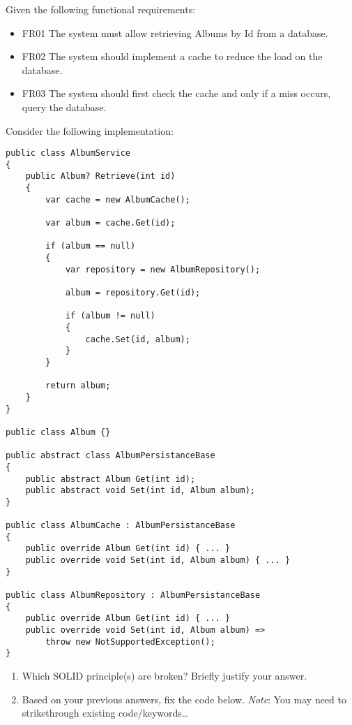 
\pgfmathsetmacro{}

\noindent Given the following functional requirements:

\begin{itemize}
    \item FR01 The system must allow retrieving Albums by Id from a database.
    \item FR02 The system should implement a cache to reduce the load on the database.
    \item FR03 The system should first check the cache and only if a miss occurs, query the database.
\end{itemize}


\vskip 15pt
\noindent Consider the following implementation:

\begin{lstlisting}
public class AlbumService
{
    public Album? Retrieve(int id)
    {
        var cache = new AlbumCache();

        var album = cache.Get(id);

        if (album == null)
        {
            var repository = new AlbumRepository();

            album = repository.Get(id);

            if (album != null)
            {
                cache.Set(id, album);
            }
        }

        return album;
    }
}

public class Album {}

public abstract class AlbumPersistanceBase
{
    public abstract Album Get(int id);
    public abstract void Set(int id, Album album);
}

public class AlbumCache : AlbumPersistanceBase
{
    public override Album Get(int id) { ... }
    public override void Set(int id, Album album) { ... }
}

public class AlbumRepository : AlbumPersistanceBase
{
    public override Album Get(int id) { ... }
    public override void Set(int id, Album album) =>
        throw new NotSupportedException();
}
\end{lstlisting}

\begin{enumerate}[a]
    \item {} Which SOLID principle(s) are broken? Briefly justify your answer.
		\ifdefined\questionTwelveAnswerA
		  \newline\answer\questionTwelveAnswerA
		\else
		  \\
		\fi
	






\vskip 15pt
    \item {} Based on your previous answers, fix the code below. \textit{Note}: You may need to strikethrough existing code/keywords\ldots
		

\end{enumerate}

